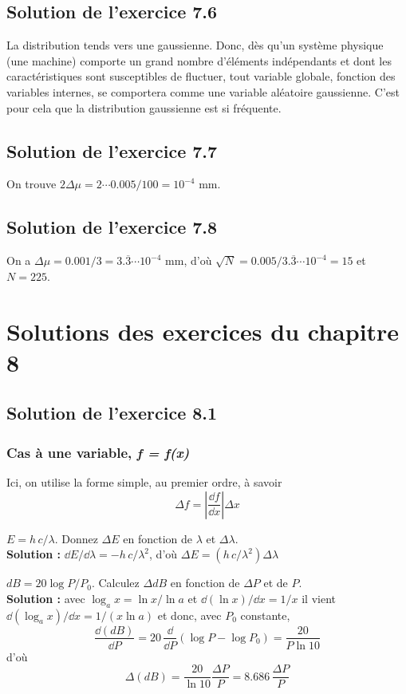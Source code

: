 \subsection*{Solution de l'exercice 7.6}

La distribution tends vers une gaussienne. Donc, dès qu'un système physique (une machine) comporte un grand nombre d'éléments indépendants et dont les caractéristiques sont susceptibles  de fluctuer, tout variable globale, fonction des variables internes, se comportera comme une variable aléatoire gaussienne. C'est pour cela que la distribution gaussienne est si fréquente.

\subsection*{Solution de l'exercice 7.7}

On trouve $2\Delta\mu=2\cdots0.005/100=10^{-4}$ mm.

\subsection*{Solution de l'exercice 7.8}

On a $\Delta\mu=0.001/3=3.\overline{3}\cdots10^{-4}$ mm, d'où $\sqrt{N}=0.005/3.\overline{3}\cdots10^{-4}=15$ et $N=225$.

\section{Solutions des exercices du chapitre 8}

\subsection*{Solution de l'exercice 8.1}

\subsubsection*{Cas à une variable, \textit{f = f(x)}}

Ici, on utilise la forme simple, au premier ordre, à savoir
$$
\Delta f=\left|\frac{\dd f}{\dd x}\right|\Delta x
$$

\begin{description}\renewcommand{\labelitemi}{$\bullet$}
\item[Energie du photon] $E=h\,c/\lambda$. Donnez $\Delta E$ en fonction de $\lambda$ et $\Delta\lambda$.\\
\textbf{Solution :} $\dd E/\dd\lambda=-h\,c/\lambda^2$, d'où $\Delta E=(h\,c/\lambda^2)\Delta\lambda$
\item[Décibels et puissance] $dB=20\log{P/P_0}$. Calculez $\Delta dB$ en fonction de $\Delta P$ et de $P$.\\
\textbf{Solution :} avec $\log_a x=\ln x / \ln a$ et $\dd(\ln x)/\dd x=1/x$ il vient $\dd(\log_a x)/\dd x=1/(x\ln a)$ et donc, avec $P_0$ constante,
$$
\frac{\dd(dB)}{\dd P}=20\,\frac{\dd}{\dd P}(\log{P}-\log{P_0})=\frac{20}{P\ln{10}}
$$
d'où
$$
\Delta(dB)=\frac{20}{\ln{10}}\frac{\Delta P}{P}=8.686\,\frac{\Delta P}{P}
$$
\end{description}

